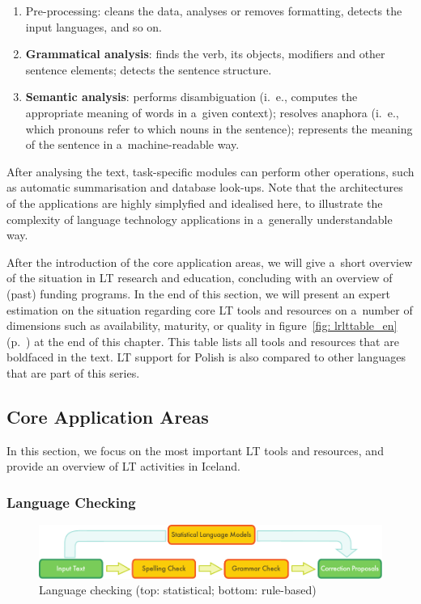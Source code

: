 \begin{multicols}{2}
\begin{enumerate} \item Pre-processing: cleans the data, analyses or
removes formatting, detects the input languages, and so on. \item
\textbf{Grammatical analysis}: finds the verb, its objects, modifiers and other sentence elements; detects the sentence structure. \item
\textbf{Semantic analysis}: performs disambiguation (i.\, e., computes
the appropriate meaning of words in a~given context); resolves
anaphora (i.\, e., which pronouns refer to which nouns in the
sentence); represents the meaning of the sentence in
a~machine-readable way. \end{enumerate} 

After analysing the text, task-specific modules can perform other
operations, such as automatic summarisation and database look-ups.
Note that the architectures of the applications are highly simplyfied
and idealised here, to illustrate the complexity of language
technology applications in a~generally understandable way. 

After the introduction of the core application areas, we will give
a~short overview of the situation in LT research and education,
concluding with an overview of (past) funding programs. In the end of
this section, we will present an expert estimation on the situation
regarding core LT tools and resources on a~number of dimensions such
as availability, maturity, or quality in figure~\ref{fig:
lrlttable_en} (p.~\pageref{fig: lrlttable_en}) at the end of this
chapter. This table lists all tools and resources that are boldfaced
in the text. LT support for Polish is also compared to other languages
that are part of this series. 

\subsection{Core Application Areas} 

In this section, we focus on the most important LT tools and
resources, and provide an overview of LT activities in Iceland. 

\subsubsection{Language Checking} 

\begin{figure}[t]  \center
\includegraphics[width=\textwidth]{../_media/english/language_checking}
\caption{Language checking (top: statistical; bottom: rule-based)}
\label{fig: langcheckingaarch_en} 
\end{figure} 


\end{multicols}
